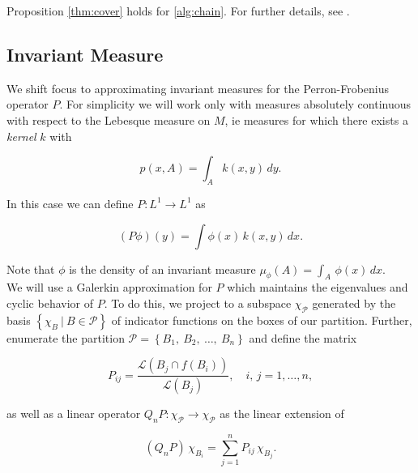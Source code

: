 \begin{corollary}
    Proposition \ref{thm:cover} holds for \autoref{alg:chain}. For further details, 
    see \cite*{chain}.
\end{corollary}


\subsection{Invariant Measure}

We shift focus to approximating invariant measures for the Perron-Frobenius operator $P$.
For simplicity we will work only with measures absolutely continuous with respect to the 
Lebesque measure on $M$, ie measures for which there exists a \emph{kernel} $k$ with 

\begin{equation}
    \label{eq:kernel}
    p(x, A) = \int_A k(x, y)\, dy.
\end{equation}

In this case we can define $P: L^1 \to L^1$ as 

\begin{equation}
    (P \phi)(y) = \int \phi (x)\, k(x, y)\, dx.
\end{equation}

Note that $\phi$ is the density of an invariant measure 
$\mu_\phi (A) = \int_A\, \phi(x)\, dx$. \\

We will use a Galerkin approximation for $P$ which maintains the eigenvalues and cyclic 
behavior of $P$. To do this, we project to a subspace 
$\chi_{\mathcal{P}}$ generated by the basis $\left\{ \chi_B\ \vert\ B \in \mathcal{P} \right\}$ 
of indicator functions on the boxes of our partition. Further, enumerate the partition 
$\mathcal{P} = \left\{ B_1,\ B_2,\ \ldots,\ B_n \right\}$ and define the matrix 

\begin{equation}
    \label{eq:pij}
    P_{ij} = \frac{\mathcal{L}\left(B_j \cap f(B_i)\right)}{\mathcal{L}(B_j)}, 
    \quad i,\, j = 1, \ldots, n,
\end{equation}

as well as a linear operator $Q_n P : \chi_{\mathcal{P}} \to \chi_{\mathcal{P}}$ as 
the linear extension of 

\begin{equation}
    \label{eq:qnp}
    (Q_n P)\, \chi_{B_i} = \sum_{j = 1}^n P_{ij}\, \chi_{B_j}.
\end{equation}


